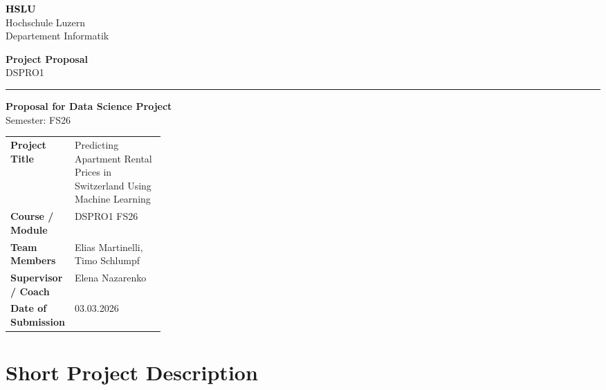 \documentclass[11pt,a4paper]{article}
\newcommand{\hsluwordmark}{%
  {\fontsize{22}{24}\selectfont\bfseries\textcolor{black}{HSLU}}%
}
\newcommand{\proposaltype}{%
  {\fontsize{13}{15}\selectfont\bfseries Project Proposal}
}
\newcommand{\moduleline}{%
  {\fontsize{11}{13}\selectfont DSPRO1}
}
\begin{document}
\begin{minipage}[t]{0.62\textwidth}
    \hsluwordmark\\[-1mm]
    {\small\color{hsluGray}Hochschule Luzern}\\[-0.5mm]
    {\small\color{hsluGray}Departement Informatik}
\end{minipage}
\hfill
\begin{minipage}[t]{0.35\textwidth}
    \raggedleft
    \proposaltype\\[1mm]
    \moduleline
\end{minipage}

\vspace{8mm}
{\color{hsluGray}\rule{\textwidth}{1.2pt}}

\vspace{8mm}

\begin{center}
    {\LARGE\bfseries\color{hsluDark}Proposal for Data Science Project}\\[1mm]
    {\large\color{hsluGray}Semester: FS26}
\end{center}

\vspace{8mm}

\colorbox{boxGray}{%
\parbox{\dimexpr\linewidth-2\fboxsep\relax}{
\vspace{1mm}
\renewcommand{\arraystretch}{1.35}
\begin{tabularx}{\linewidth}{>{\bfseries}p{0.26\linewidth} X}
Project Title & Predicting Apartment Rental Prices in Switzerland Using Machine Learning \\
Course / Module & DSPRO1 FS26 \\
Team Members & Elias Martinelli, Timo Schlumpf \\
Supervisor / Coach & Elena Nazarenko \\
Date of Submission & 03.03.2026 \\
\end{tabularx}
\vspace{1mm}
}
}

\vspace{1em}

\section{Short Project Description}
\end{document}
